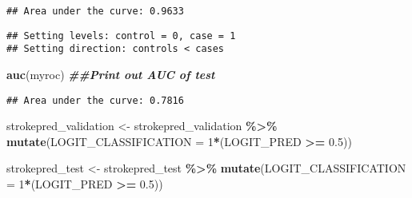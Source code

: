 \documentclass[
]{article}
\newenvironment{Shaded}{\begin{snugshade}}{\end{snugshade}}
\newcommand{\AttributeTok}[1]{\textcolor[rgb]{0.13,0.29,0.53}{#1}}
\newcommand{\CommentTok}[1]{\textcolor[rgb]{0.56,0.35,0.01}{\textit{#1}}}
\newcommand{\DecValTok}[1]{\textcolor[rgb]{0.00,0.00,0.81}{#1}}
\newcommand{\DocumentationTok}[1]{\textcolor[rgb]{0.56,0.35,0.01}{\textbf{\textit{#1}}}}
\newcommand{\FloatTok}[1]{\textcolor[rgb]{0.00,0.00,0.81}{#1}}
\newcommand{\FunctionTok}[1]{\textcolor[rgb]{0.13,0.29,0.53}{\textbf{#1}}}
\newcommand{\NormalTok}[1]{#1}
\newcommand{\OtherTok}[1]{\textcolor[rgb]{0.56,0.35,0.01}{#1}}
\newcommand{\SpecialCharTok}[1]{\textcolor[rgb]{0.81,0.36,0.00}{\textbf{#1}}}
\newcommand{\StringTok}[1]{\textcolor[rgb]{0.31,0.60,0.02}{#1}}
\begin{document}
\begin{verbatim}
## Area under the curve: 0.9633
\end{verbatim}

\begin{Shaded}
\end{Shaded}

\begin{verbatim}
## Setting levels: control = 0, case = 1
## Setting direction: controls < cases
\end{verbatim}

\begin{Shaded}
\begin{Highlighting}[]
\FunctionTok{auc}\NormalTok{(myroc) }\DocumentationTok{\#\#Print out AUC of test}
\end{Highlighting}
\end{Shaded}

\begin{verbatim}
## Area under the curve: 0.7816
\end{verbatim}

\begin{Shaded}
\begin{Highlighting}[]
\NormalTok{strokepred\_validation }\OtherTok{\textless{}{-}}\NormalTok{ strokepred\_validation }\SpecialCharTok{\%\textgreater{}\%} \FunctionTok{mutate}\NormalTok{(}\AttributeTok{LOGIT\_CLASSIFICATION =} \DecValTok{1}\SpecialCharTok{*}\NormalTok{(LOGIT\_PRED }\SpecialCharTok{\textgreater{}=} \FloatTok{0.5}\NormalTok{))}

\NormalTok{strokepred\_test }\OtherTok{\textless{}{-}}\NormalTok{ strokepred\_test }\SpecialCharTok{\%\textgreater{}\%} \FunctionTok{mutate}\NormalTok{(}\AttributeTok{LOGIT\_CLASSIFICATION =} \DecValTok{1}\SpecialCharTok{*}\NormalTok{(LOGIT\_PRED }\SpecialCharTok{\textgreater{}=} \FloatTok{0.5}\NormalTok{))}
\end{Highlighting}
\end{Shaded}

\begin{Shaded}
\end{Shaded}
\end{document}
